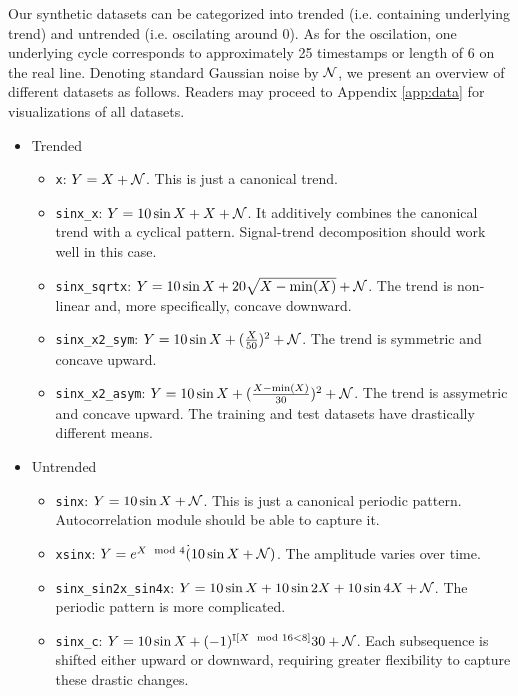 Our synthetic datasets can be categorized into trended (i.e. containing underlying trend) and untrended (i.e. oscilating around 0). 
As for the oscilation, one underlying cycle corresponds to approximately 25 timestamps or length of 6 on the real line. 
Denoting standard Gaussian noise by $\mathcal{N}$, we present an overview of different datasets as follows. 
Readers may proceed to Appendix \ref{app:data} for visualizations of all datasets. \begin{itemize}
    \item Trended \begin{itemize}
        \item \texttt{x}: $Y = X + \mathcal{N}$. This is just a canonical trend. 
        \item \texttt{sinx\_x}: $Y = 10\sin X + X + \mathcal{N}$. It additively combines the canonical trend with a cyclical pattern. Signal-trend decomposition should work well in this case. 
        \item \texttt{sinx\_sqrtx}: $Y = 10\sin X + 20\sqrt{X - \min(X)} + \mathcal{N}$. The trend is non-linear and, more specifically, concave downward. 
        \item \texttt{sinx\_x2\_sym}: $Y = 10\sin X + (\frac{X}{50})^2 + \mathcal{N}$. The trend is symmetric and concave upward. 
        \item \texttt{sinx\_x2\_asym}: $Y = 10\sin X + (\frac{X - \min(X)}{30})^2 + \mathcal{N}$. The trend is assymetric and concave upward. The training and test datasets have drastically different means. 
    \end{itemize}
    \item Untrended \begin{itemize}
        \item \texttt{sinx}: $Y = 10\sin X + \mathcal{N}$. This is just a canonical periodic pattern. Autocorrelation module should be able to capture it. 
        \item \texttt{xsinx}: $Y = e^{X \mod 4} \dot (10\sin X + \mathcal{N})$. The amplitude varies over time. 
        \item \texttt{sinx\_sin2x\_sin4x}: $Y = 10\sin X + 10\sin 2X + 10\sin 4X + \mathcal{N}$. The periodic pattern is more complicated. 
        \item \texttt{sinx\_c}: $Y = 10\sin X + (-1)^{\mathbb{I}[X \mod 16 < 8]} 30 + \mathcal{N}$. Each subsequence is shifted either upward or downward, requiring greater flexibility to capture these drastic changes. 
    \end{itemize}
\end{itemize}

